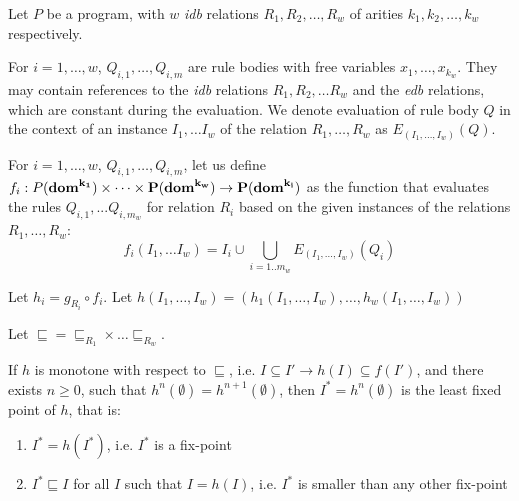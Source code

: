 Let $P$ be a \datalogra program, with $w$ \emph{idb} relations $R_1, R_2, \dots, R_w$ of arities $k_1, k_2, \dots, k_w$ respectively.

\begin{figure}[h!]
\end{figure}

For $i = 1, \dots, w$, $Q_{i,1}, \dots, Q_{i,m}$ are rule bodies with free variables $x_1, \dots, x_{k_w}$. They may contain references to the \emph{idb} relations $R_1, R_2, \dots R_w$ and the \emph{edb} relations, which are constant during the evaluation. We denote evaluation of rule body $Q$ in the context of an instance $I_1, \dots I_w$ of the relation $R_1, \dots, R_w$ as $E_(I_1, \dots, I_w)(Q)$.

For $i = 1, \dots, w$, $Q_{i,1}, \dots, Q_{i,m}$, let us define $f_i: P(\bf{dom}^{k_1}) \times \dots \times P(\bf{dom}^{k_w}) \to P(\bf{dom}^{k_i})$ as the function that evaluates the rules $Q_{i,1}, ... Q_{i, m_w}$ for relation $R_i$ based on the given instances of the relations $R_1, \dots, R_w$:
$$ f_i(I_1, \dots I_w) = I_i \cup \bigcup_{i=1..{m_w}} E_(I_1, \dots, I_w)(Q_i) $$

Let $h_i = g_{R_i} \circ f_i$. Let $h(I_1, \dots, I_w) = (h_1(I_1, \dots, I_w), \dots, h_w(I_1, \dots, I_w))$

Let $\sqsubseteq = \sqsubseteq_{R_1} \times \dots \sqsubseteq_{R_w}$.

\begin{thm}
If $h$ is monotone with respect to $\sqsubseteq$, i.e. $I \subseteq I' \rightarrow h(I) \subseteq f(I')$, and there exists $n \ge 0 $, such that $h^n(\emptyset) = h^{n+1}(\emptyset)$, then $I^* = h^n(\emptyset)$ is the least fixed point of $h$, that is:
\begin{enumerate}
\item $I^* = h(I^*)$, i.e. $I^*$ is a fix-point
\item $I^* \sqsubseteq I$ for all $I$ such that $I = h(I)$, i.e. $I^*$ is smaller than any other fix-point
\end{enumerate}
\end{thm}


